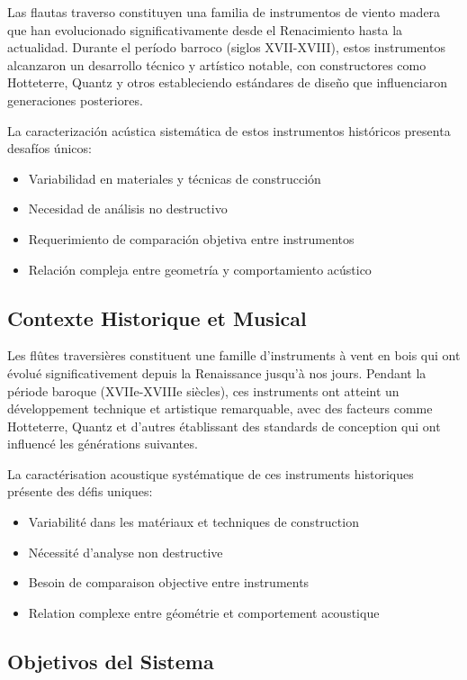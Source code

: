 \documentclass[12pt,a4paper,twocolumn]{article}
\begin{document}
Las flautas traverso constituyen una familia de instrumentos de viento madera que han evolucionado significativamente desde el Renacimiento hasta la actualidad. Durante el período barroco (siglos XVII-XVIII), estos instrumentos alcanzaron un desarrollo técnico y artístico notable, con constructores como Hotteterre, Quantz y otros estableciendo estándares de diseño que influenciaron generaciones posteriores.

La caracterización acústica sistemática de estos instrumentos históricos presenta desafíos únicos:
\begin{itemize}
    \item Variabilidad en materiales y técnicas de construcción
    \item Necesidad de análisis no destructivo
    \item Requerimiento de comparación objetiva entre instrumentos
    \item Relación compleja entre geometría y comportamiento acústico
\end{itemize}

\subsection{Contexte Historique et Musical}

Les flûtes traversières constituent une famille d'instruments à vent en bois qui ont évolué significativement depuis la Renaissance jusqu'à nos jours. Pendant la période baroque (XVIIe-XVIIIe siècles), ces instruments ont atteint un développement technique et artistique remarquable, avec des facteurs comme Hotteterre, Quantz et d'autres établissant des standards de conception qui ont influencé les générations suivantes.

La caractérisation acoustique systématique de ces instruments historiques présente des défis uniques:
\begin{itemize}
    \item Variabilité dans les matériaux et techniques de construction
    \item Nécessité d'analyse non destructive
    \item Besoin de comparaison objective entre instruments
    \item Relation complexe entre géométrie et comportement acoustique
\end{itemize}

\subsection{Objetivos del Sistema}
\end{document}
